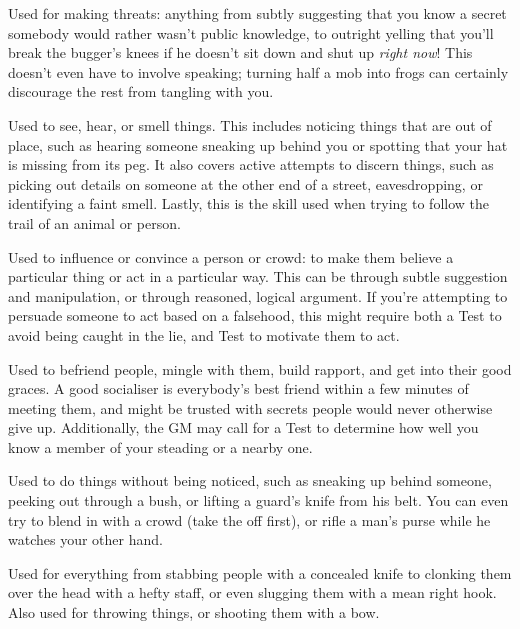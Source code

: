 
Used for making threats: anything from subtly suggesting that you know a secret somebody would rather wasn't public knowledge, to outright yelling that you'll break the bugger's knees if he doesn't sit down and shut up \emph{right now}!
This doesn't even have to involve speaking; turning half a mob into frogs can certainly discourage the rest from tangling with you.


Used to see, hear, or smell things.
This includes noticing things that are out of place, such as hearing someone sneaking up behind you or spotting that your hat is missing from its peg.
It also covers active attempts to discern things, such as picking out details on someone at the other end of a street, eavesdropping, or identifying a faint smell.
Lastly, this is the skill used when trying to follow the trail of an animal or person.


Used to influence or convince a person or crowd: to make them believe a particular thing or act in a particular way.
This can be through subtle suggestion and manipulation, or through reasoned, logical argument.
If you're attempting to persuade someone to act based on a falsehood, this might require both a  Test to avoid being caught in the lie, and  Test to motivate them to act.


Used to befriend people, mingle with them, build rapport, and get into their good graces.
A good socialiser is everybody's best friend within a few minutes of meeting them, and might be trusted with secrets people would never otherwise give up.
Additionally, the GM may call for a  Test to determine how well you know a member of your steading or a nearby one.


Used to do things without being noticed, such as sneaking up behind someone, peeking out through a bush, or lifting a guard's knife from his belt.
You can even try to blend in with a crowd (take the {\hat} off first), or rifle a man's purse while he watches your other hand.


Used for everything from stabbing people with a concealed knife to clonking them over the head with a hefty staff, or even slugging them with a mean right hook.
Also used for throwing things, or shooting them with a bow.


